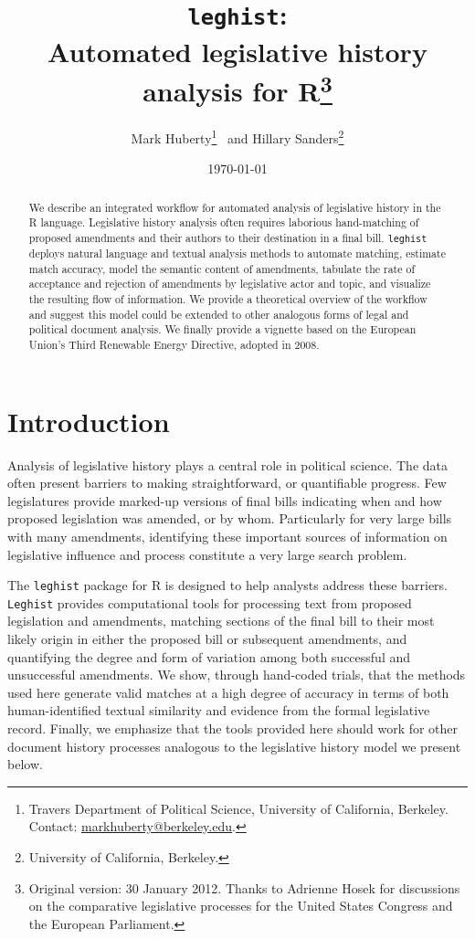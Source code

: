 \documentclass[11pt]{article}
\title{\texttt{leghist}:\\ Automated legislative history analysis for
  R\thanks{Original version: 30 January 2012. Thanks to Adrienne Hosek for discussions on the
  comparative legislative processes for the United States Congress and
the European Parliament.}}
\author{Mark Huberty\thanks{Travers Department of Political Science,
    University of California, Berkeley. Contact:
    \url{markhuberty@berkeley.edu}.}~ and Hillary Sanders\thanks{University of
California, Berkeley.}}
\date{\today}
\begin{document}
%
\maketitle

\begin{abstract}
  We describe an integrated workflow for automated analysis of
  legislative history in the R language. Legislative history analysis
  often requires laborious hand-matching of proposed amendments and
  their authors to their destination in a final bill. \texttt{leghist}
  deploys natural language and textual analysis methods to automate
  matching, estimate match accuracy, model the
  semantic content of amendments, tabulate the rate of acceptance and
  rejection of amendments by legislative actor and topic, and visualize the
  resulting flow of information. We provide a theoretical
  overview of the workflow and suggest this model could be extended to
  other analogous forms of legal and political document analysis. We
  finally provide a vignette based on the European Union's Third
  Renewable Energy Directive, adopted in 2008. 
\end{abstract}

\tableofcontents 
\section{Introduction}
\label{sec:introduction}

Analysis of legislative history plays a central role in political
science. The data often present barriers to making straightforward, or
quantifiable progress. Few legislatures provide marked-up versions of final bills
indicating when and how proposed legislation was amended, or by
whom. Particularly for very large bills with many amendments,
identifying these important sources of information on legislative
influence and process constitute a very large search problem. 

The \texttt{leghist} package for R is designed to help analysts
address these barriers. \texttt{Leghist} provides computational tools for
processing text from proposed legislation and amendments, matching
sections of the final bill to their most likely origin in either the
proposed bill or subsequent amendments, and quantifying the degree and
form of variation among both successful and unsuccessful
amendments. We show, through hand-coded trials, that the
methods used here generate valid matches at a high degree of accuracy
in terms of both human-identified textual similarity and evidence from
the formal legislative record. Finally, we emphasize that the tools
provided here should work for other document history processes
analogous to the legislative history model we present below.
\end{document}
